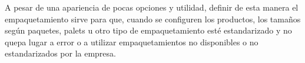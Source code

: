 A pesar de una apariencia de pocas opciones y utilidad, definir de esta manera el empaquetamiento sirve para que, cuando se configuren los productos, los tamaños según paquetes, palets u otro tipo de empaquetamiento esté estandarizado y no quepa lugar a error o a utilizar empaquetamientos no disponibles o no estandarizados por la empresa.


